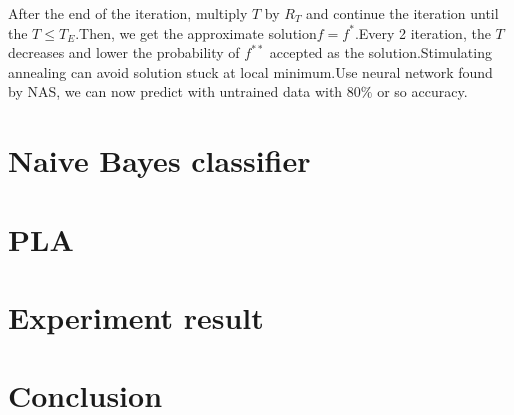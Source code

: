 \documentclass[twocolumn,10pt]{article}
\begin{document}
After the end of the iteration, multiply $T$ by $R_T$ and continue the iteration until the $T \le T_E$.Then, we get the approximate solution$f=f^*$.Every 2 iteration, the $T$ decreases and lower the probability of $f^{**}$ accepted as the solution.Stimulating annealing can avoid solution stuck at local minimum.Use neural network found by NAS, we can now predict with untrained data with $80\%$ or so accuracy.
\section{Naive Bayes classifier}

\section{PLA}

\section{Experiment result}

\section{Conclusion}



\end{document}
